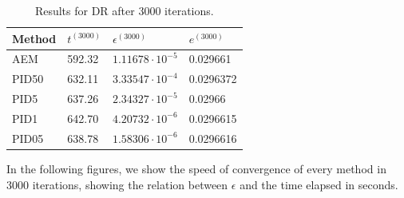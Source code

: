\begin{table}[H]
\begin{center}
\renewcommand*{\arraystretch}{1.5}
\begin{tabular}{|C{1.2cm}|C{1cm}|C{2.2cm}|C{1.7cm}|}\hline
Method & $t^{(3000)}$ & $\epsilon^{(3000)}$ & $e^{(3000)}$ \\ \hline
AEM &  592.32 & $1.11678 \cdot 10^{-5}$ & 0.029661 \\ \hline
PID50 &  632.11 & $3.33547 \cdot 10^{-4}$ & 0.0296372 \\ \hline
PID5 &  637.26 & $2.34327 \cdot 10^{-5}$ & 0.02966 \\ \hline
PID1 &  642.70 & $4.20732 \cdot 10^{-6}$ & 0.0296615 \\ \hline
PID05 &  638.78 & $1.58306 \cdot 10^{-6}$ & 0.0296616 \\ \hline
\end{tabular}
\caption{Results for DR after 3000 iterations.}
\end{center}
\end{table}


In the following figures, we show the speed of convergence of every method in 3000 iterations, showing the relation between $\epsilon$ and the time elapsed in seconds.

